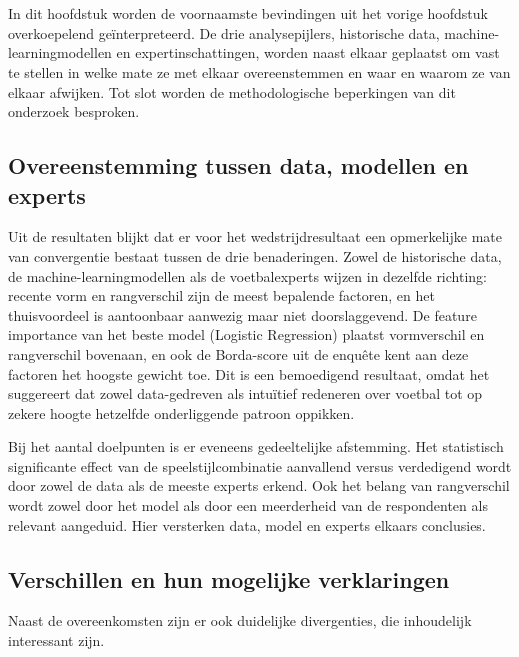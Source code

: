 \chapter{}%
\label{ch:discussie}

In dit hoofdstuk worden de voornaamste bevindingen uit het vorige hoofdstuk overkoepelend geïnterpreteerd.
De drie analysepijlers, historische data, machine-learningmodellen en expertinschattingen,
worden naast elkaar geplaatst om vast te stellen in welke mate ze met elkaar overeenstemmen en waar en waarom ze van elkaar afwijken.
Tot slot worden de methodologische beperkingen van dit onderzoek besproken.

\section{Overeenstemming tussen data, modellen en experts}

Uit de resultaten blijkt dat er voor het wedstrijdresultaat een opmerkelijke mate van convergentie bestaat
tussen de drie benaderingen. Zowel de historische data, de machine-learningmodellen als de voetbalexperts
wijzen in dezelfde richting: recente vorm en rangverschil zijn de meest bepalende factoren, en het thuisvoordeel
is aantoonbaar aanwezig maar niet doorslaggevend. De feature importance van het beste model (Logistic Regression)
plaatst vormverschil en rangverschil bovenaan, en ook de Borda-score uit de enquête kent aan deze factoren het hoogste gewicht toe.
Dit is een bemoedigend resultaat, omdat het suggereert dat zowel data-gedreven als intuïtief redeneren over voetbal
tot op zekere hoogte hetzelfde onderliggende patroon oppikken.

\vspace{5pt}

Bij het aantal doelpunten is er eveneens gedeeltelijke afstemming. Het statistisch significante effect
van de speelstijlcombinatie aanvallend versus verdedigend wordt door zowel de data als de meeste experts erkend.
Ook het belang van rangverschil wordt zowel door het model als door een meerderheid
van de respondenten als relevant aangeduid. 
Hier versterken data, model en experts elkaars conclusies.

\section{Verschillen en hun mogelijke verklaringen}

Naast de overeenkomsten zijn er ook duidelijke divergenties, die inhoudelijk interessant zijn.

